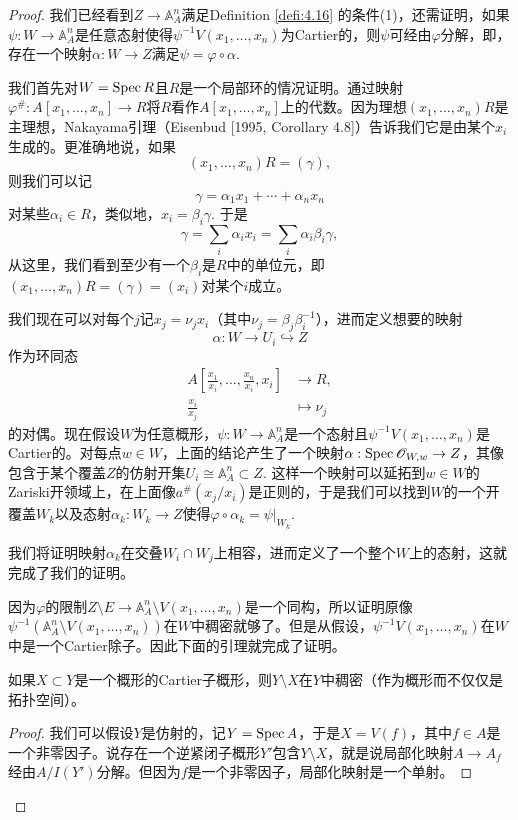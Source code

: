 \begin{proof}
	我们已经看到$Z\to \mathbb A_A^n$满足Definition \ref{defi:4.16} 的条件(1)，还需证明，如果$\psi:W\to \mathbb A_A^n$是任意态射使得$\psi^{-1}V(x_1,\dots,x_n)$为Cartier的，则$\psi$可经由$\varphi$分解，即，存在一个映射$\alpha:W\to Z$满足$\psi=\varphi\circ\alpha$.

	我们首先对$W=\operatorname{Spec} R$且$R$是一个局部环的情况证明。通过映射$\varphi^\#:A[x_1,\dots,x_n]\to R$将$R$看作$A[x_1,\dots,x_n]$上的代数。因为理想$(x_1,\dots,x_n)R$是主理想，Nakayama引理（Eisenbud [1995, Corollary 4.8]）告诉我们它是由某个$x_i$生成的。更准确地说，如果
	\[
		(x_1,\dots,x_n)R=(\gamma),
	\]
	则我们可以记
	\[
		\gamma=\alpha_1 x_1+\cdots +\alpha_n x_n
	\]
	对某些$\alpha_i\in R$，类似地，$x_i=\beta_i\gamma$. 于是
	\[
		\gamma=\sum_i \alpha_i x_i=\sum_i \alpha_i \beta_i \gamma,
	\]
	从这里，我们看到至少有一个$\beta_i$是$R$中的单位元，即$(x_1,\dots,x_n)R=(\gamma)=(x_i)$对某个$i$成立。

	我们现在可以对每个$j$记$x_j=\nu_j x_i$（其中$\nu_j=\beta_j\beta_i^{-1}$），进而定义想要的映射
	\[
		\alpha:W\to U_i\hookrightarrow Z
	\]
	作为环同态
	\[
	\begin{aligned}
		A\left[\frac{x_1}{x_i},\dots,\frac{x_n}{x_i},x_i\right] & \longrightarrow R,\\
		\frac{x_i}{x_j}&\longmapsto \nu_j
	\end{aligned}
	\]
	的对偶。现在假设$W$为任意概形，$\psi:W\to \mathbb A_A^n$是一个态射且$\psi^{-1}V(x_1,\dots,x_n)$是Cartier的。对每点$w\in W$，上面的结论产生了一个映射$\alpha:\operatorname{Spec} \mathscr O_{W,w}\to Z$，其像包含于某个覆盖$Z$的仿射开集$U_i\cong \mathbb A_A^n\subset Z$. 这样一个映射可以延拓到$w\in W$的Zariski开领域上，在上面像$a^\#(x_j/x_i)$是正则的，于是我们可以找到$W$的一个开覆盖$W_k$以及态射$\alpha_k:W_k\to Z$使得$\varphi\circ \alpha_k=\psi|_{W_k}$.

	我们将证明映射$\alpha_k$在交叠$W_i\cap W_j$上相容，进而定义了一个整个$W$上的态射，这就完成了我们的证明。

	因为$\varphi$的限制$Z\setminus E\to \mathbb A_A^n\setminus V(x_1,\dots,x_n)$是一个同构，所以证明原像$\psi^{-1}(\mathbb A_A^n\setminus V(x_1,\dots,x_n))$在$W$中稠密就够了。但是从假设，$\psi^{-1}V(x_1,\dots,x_n)$在$W$中是一个Cartier除子。因此下面的引理就完成了证明。

	\begin{lem}\label{lem:4.19}
		如果$X\subset Y$是一个概形的Cartier子概形，则$Y\setminus X$在$Y$中稠密（作为概形而不仅仅是拓扑空间）。
	\end{lem}

	\begin{proof}
		我们可以假设$Y$是仿射的，记$Y=\operatorname{Spec} A$，于是$X=V(f)$，其中$f\in A$是一个非零因子。说存在一个逆紧闭子概形$Y'$包含$Y\setminus X$，就是说局部化映射$A\to A_f$经由$A/I(Y')$分解。但因为$f$是一个非零因子，局部化映射是一个单射。
	\end{proof}
	\let\qed\relax
\end{proof}

